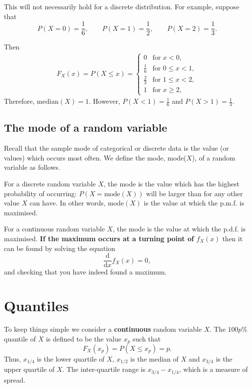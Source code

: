 \documentclass[
  11pt,
  british,
  openany, a4paper]{book}
\begin{document}
This will not necessarily hold for a discrete distribution. For example, suppose that
\[ P(X=0)=\frac16, \qquad  P(X=1)=\frac12, \qquad P(X=2)=\frac13. \]

Then
\begin{eqnarray*}
F_X(x) = P(X \leq x) = \left\{\begin{array}{ll}
0 & \mbox{for } x <0, \\
\frac16 & \mbox{for } 0 \leq x < 1, \\
\frac23 & \mbox{for } 1 \leq x < 2, \\
1 & \mbox{for } x \geq 2, 
\end{array}\right.
\end{eqnarray*}
Therefore, \(\mathrm{median}(X) = 1\). However, \(P(X<1)=\frac16\) and \(P(X>1)=\frac13\).

\hypertarget{the-mode-of-a-random-variable}{%
\subsection{The mode of a random variable}\label{the-mode-of-a-random-variable}}

Recall that the sample mode of categorical or discrete data is the value (or values) which occurs most often. We define the mode, mode(\(X\)), of a random variable as follows.

For a discrete random variable \(X\), the mode is the value which has the highest probability of occurring: \(P(X=\mathrm{mode}(X))\) will be larger than for any other value \(X\) can have. In other words, \(\mathrm{mode}(X)\) is the value at which the p.m.f. is maximised.

For a continuous random variable \(X\), the mode is the value at which the p.d.f. is maximised. \textbf{If the maximum occurs at a turning point of \(f_X(x)\)} then it can be found by solving the equation
\[ \frac{\mathrm{d}}{\mathrm{d}x} f_X(x)  = 0, \]
and checking that you have indeed found a maximum.

\hypertarget{quantiles}{%
\section{Quantiles}\label{quantiles}}

To keep things simple we consider a \textbf{continuous} random variable \(X\). The \(100p\%\) quantile of \(X\) is defined to be the value \(x_p\) such that
\[ F_X(x_p)=P(X \leq x_p) = p. \]
Thus, \(x_{1/4}\) is the lower quartile of \(X\), \(x_{1/2}\) is the median of \(X\) and \(x_{3/4}\) is the upper quartile of \(X\). The inter-quartile range is \(x_{3/4}-x_{1/4}\), which is a measure of spread.
\end{document}
